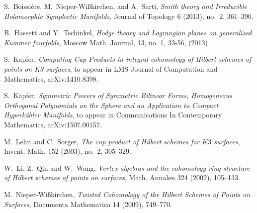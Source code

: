 \documentclass[11pt,a4paper,sans,english]{article}
\begin{document}

\begin{thebibliography}{10}

S.~Boissi\`ere, M.~Nieper-Wi{\ss}kirchen, and A.~Sarti, \emph{Smith theory and 
  Irreducible Holomorphic Symplectic Manifolds}, Journal of Topology 6 (2013), no.~2, 361--390.

B.~Hassett and Y.~Tschinkel, \emph{ Hodge theory and Lagrangian planes on 
  generalized Kummer fourfolds}, Moscow Math. Journal, 13, no. 1, 33-56, (2013) 

S.~Kapfer, \emph{Computing Cup-Products in integral cohomology of Hilbert schemes of points on K3 surfaces}, to appear in LMS Journal of Computation and Mathematics, arXiv:1410.8398.

S.~Kapfer, \emph{Symmetric Powers of Symmetric Bilinear Forms, Homogeneous Orthogonal Polynomials on the Sphere and an Application to Compact Hyperk\"ahler Manifolds}, to appear in Communications In Contemporary Mathematics, arXiv:1507.00157.

M.~Lehn and C.~Sorger, \emph{The cup product of {H}ilbert schemes for {$K3$}
  surfaces}, Invent. Math. 152 (2003), no.~2, 305--329.

W.~Li, Z.~Qin and W.~Wang, \emph{Vertex algebras and the cohomology ring structure of 
  Hilbert schemes of points on surfaces}, Math. Annalen 324 (2002), 105--133.

M.~Nieper-Wi\ss kirchen, \emph{Twisted Cohomology of the Hilbert Schemes of Points on Surfaces},
  Documenta Mathematica 14 (2009), 749--770.
\end{thebibliography}
\end{document}
